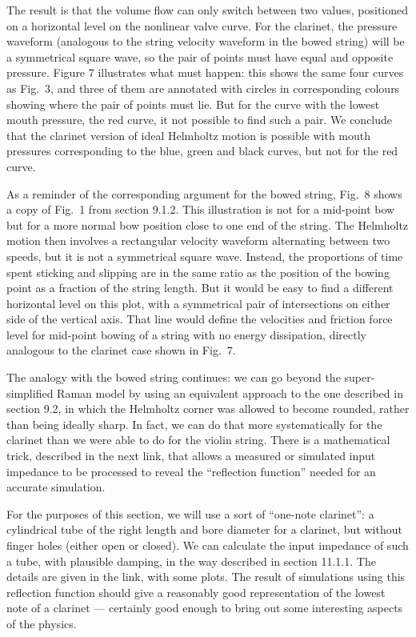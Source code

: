   The result is that the volume flow can only switch between two values, 
  positioned on a horizontal level on the nonlinear valve curve. For the 
  clarinet, the pressure waveform (analogous to the string velocity waveform in 
  the bowed string) will be a symmetrical square wave, so the pair of points 
  must have equal and opposite pressure. Figure 7 illustrates what must happen: 
  this shows the same four curves as Fig.\ 3, and three of them are annotated 
  with circles in corresponding colours showing where the pair of points must 
  lie. But for the curve with the lowest mouth pressure, the red curve, it not 
  possible to find such a pair. We conclude that the clarinet version of ideal 
  Helmholtz motion is possible with mouth pressures corresponding to the blue, 
  green and black curves, but not for the red curve. 

  As a reminder of the corresponding argument for the bowed string, Fig.\ 8 
  shows a copy of Fig.\ 1 from section 9.1.2. This illustration is not for a 
  mid-point bow but for a more normal bow position close to one end of the 
  string. The Helmholtz motion then involves a rectangular velocity waveform 
  alternating between two speeds, but it is not a symmetrical square wave. 
  Instead, the proportions of time spent sticking and slipping are in the same 
  ratio as the position of the bowing point as a fraction of the string length. 
  But it would be easy to find a different horizontal level on this plot, with 
  a symmetrical pair of intersections on either side of the vertical axis. That 
  line would define the velocities and friction force level for mid-point 
  bowing of a string with no energy dissipation, directly analogous to the 
  clarinet case shown in Fig.\ 7. 

  The analogy with the bowed string continues: we can go beyond the 
  super-simplified Raman model by using an equivalent approach to the one 
  described in section 9.2, in which the Helmholtz corner was allowed to become 
  rounded, rather than being ideally sharp. In fact, we can do that more 
  systematically for the clarinet than we were able to do for the violin 
  string. There is a mathematical trick, described in the next link, that 
  allows a measured or simulated input impedance to be processed to reveal the 
  “reflection function” needed for an accurate simulation. 

  For the purposes of this section, we will use a sort of “one-note clarinet”: 
  a cylindrical tube of the right length and bore diameter for a clarinet, but 
  without finger holes (either open or closed). We can calculate the input 
  impedance of such a tube, with plausible damping, in the way described in 
  section 11.1.1. The details are given in the link, with some plots. The 
  result of simulations using this reflection function should give a reasonably 
  good representation of the lowest note of a clarinet --- certainly good 
  enough to bring out some interesting aspects of the physics. 

